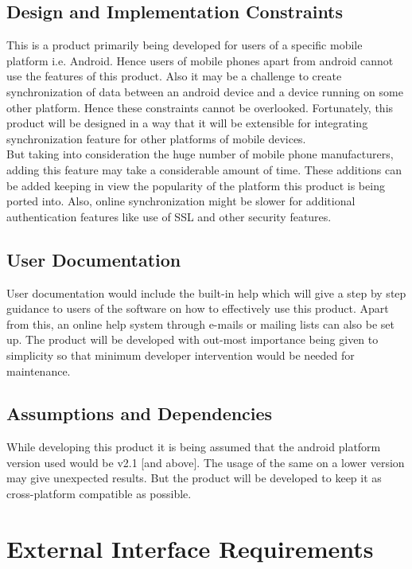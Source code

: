 \subsection{Design and Implementation Constraints}
\hspace*{0.82cm}This is a product primarily being developed for users of a specific mobile platform i.e.
Android. Hence users of mobile phones apart from android cannot use the features of this product.
Also it may be a challenge to create synchronization of data between an android device and a device
running on some other platform. Hence these constraints cannot be overlooked. Fortunately, this
product will be designed in a way that it will be extensible for integrating synchronization feature for
other platforms of mobile devices.\\[0.5cm]
\hspace*{0.82cm}But taking into consideration the huge number of mobile phone manufacturers, adding this
feature may take a considerable amount of time. These additions can be added keeping in view the
popularity of the platform this product is being ported into. Also, online synchronization might be
slower for additional authentication features like use of SSL and other security features.

\subsection{User Documentation}
\hspace*{0.82cm}User documentation would include the built-in help which will give a step by step guidance to
users of the software on how to effectively use this product. Apart from this, an online help system
through e-mails or mailing lists can also be set up. The product will be developed with out-most
importance being given to simplicity so that minimum developer intervention would be needed for
maintenance.

\subsection{Assumptions and Dependencies}
\hspace*{0.82cm}While developing this product it is being assumed that the android platform version used would
be v2.1 [and above]. The usage of the same on a lower version may give unexpected results. But the
product will be developed to keep it as cross-platform compatible as possible.

\section{External Interface Requirements}
